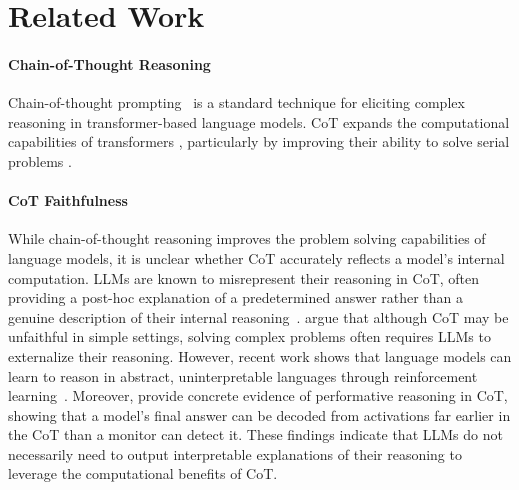 \documentclass{article}
\begin{document}
\section{Related Work}

\paragraph{Chain-of-Thought Reasoning}
Chain-of-thought prompting~\citep{wei2023chainofthought, kojima2023largelanguagemodelszeroshot} is a standard technique for eliciting complex reasoning in transformer-based language models. CoT expands the computational capabilities of transformers \citep{merrill2024expressivepowertransformerschain}, particularly by improving their ability to solve serial problems \citep{li2024chainthoughtempowerstransformers}. 

\paragraph{CoT Faithfulness}
While chain-of-thought reasoning improves the problem solving capabilities of language models, it is unclear whether CoT accurately reflects a model's internal computation. LLMs are known to misrepresent their reasoning in CoT, often providing a post-hoc explanation of a predetermined answer rather than a genuine description of their internal reasoning~\citep{turpin2023languagemodelsdontsay, lanham2023measuringfaithfulnesschainofthoughtreasoning, arcuschin2025cotnotfaithful, chen2025reasoningmodelsdontsay}. \citet{korbak2025chainthoughtmonitorabilitynew} argue that although CoT may be unfaithful in simple settings, solving complex problems often requires LLMs to externalize their reasoning. However, recent work shows that language models can learn to reason in abstract, uninterpretable languages through reinforcement learning~\citep{ramji2026thinkingwordsefficientlatent}. Moreover, \citet{boppana2026reasoningtheaterdisentanglingmodel} provide concrete evidence of performative reasoning in CoT, showing that a model's final answer can be decoded from activations far earlier in the CoT than a monitor can detect it. These findings indicate that LLMs do not necessarily need to output interpretable explanations of their reasoning to leverage the computational benefits of CoT.
\end{document}

